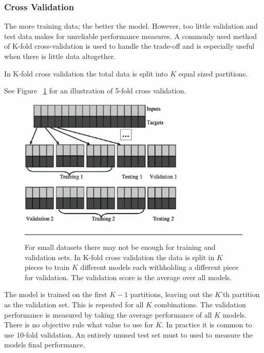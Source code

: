 \subsubsection{Cross Validation}
The more training data; the better the model. However, too little validation and test data makes for unreliable performance measures.
A commonly used method of K-fold cross-validation is used to handle the trade-off and is especially useful when there is little data altogether.

In K-fold cross validation the total data is split into $K$ equal sized partitions\citep{barber2012bayesian}.

See Figure ~\ref{fig:k_fold_validation_2} for an illustration of 5-fold cross validation.
\begin{figure}[htbp]
	\centering
		\includegraphics[width = 0.7\textwidth]{./Figures/ML_an_algorithmic_perspective_2_K_fold_validation.jpg}
		\rule{35em}{0.5pt}
	\caption[k-fold Validation]{For small datasets there may not be enough for training and validation sets. In K-fold cross validation the data is split in $K$ pieces to train $K$ different models each withholding a different piece for validation. The validation score is the average over all models.}
	\label{fig:k_fold_validation_2}
\end{figure}

The model is trained on the first $K-1$ partitions, leaving out the $K$'th partition as the validation set.
This is repeated for all $K$ combinations.
The validation performance is measured by taking the average performance of all $K$ models.
There is no objective rule what value to use for $K$. In practice it is common to use 10-fold validation.
An entirely unused test set must to used to measure the models final performance.

